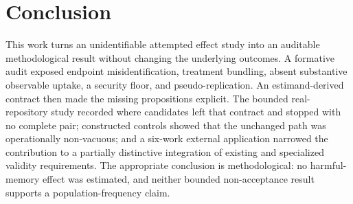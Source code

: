 \section{Conclusion}
\label{sec:conclusion}

This work turns an unidentifiable attempted effect study into an auditable
methodological result without changing the underlying outcomes.  A formative
audit exposed endpoint misidentification, treatment bundling, absent
substantive observable uptake, a security floor, and pseudo-replication.  An
estimand-derived contract then made the missing propositions explicit.  The
bounded real-repository study recorded where candidates left that contract and
stopped with no complete pair; constructed controls showed that the unchanged
path was operationally non-vacuous; and a six-work external application
narrowed the contribution to a partially distinctive integration of existing
and specialized validity requirements.  The appropriate conclusion is
methodological: no harmful-memory effect was estimated, and neither bounded
non-acceptance result supports a population-frequency claim.
